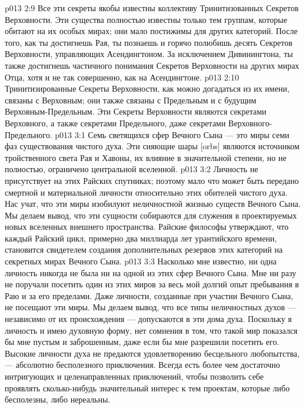 \vs p013 2:9 \pc Все эти секреты якобы известны коллективу Тринитизованных Секретов Верховности. Эти существа полностью известны только тем группам, которые обитают на их особых мирах; они мало постижимы для других категорий. После того, как ты достигнешь Рая, ты познаешь и горячо полюбишь десять Секретов Верховности, управляющих Асендингтоном. За исключением Дивинингтона, ты также достигнешь частичного понимания Секретов Верховности на других мирах Отца, хотя и не так совершенно, как на Асендингтоне.
\vs p013 2:10 Тринитизированные Секреты Верховности, как можно догадаться из их имени, связаны с Верховным; они также связаны с Предельным и с будущим Верховным\hyp{}Предельным. Эти Секреты Верховности являются секретами Верховного, а также секретами Предельного, даже секретами Верховного\hyp{}Предельного.
\vs p013 3:1 Семь светящихся сфер Вечного Сына --- это миры семи фаз существования чистого духа. Эти сияющие шары [orbs] являются источником тройственного света Рая и Хавоны, их влияние в значительной степени, но не полностью, ограничено центральной вселенной.
\vs p013 3:2 Личность не присутствует на этих Райских спутниках; поэтому мало что может быть передано смертной и материальной личности относительно этих обителей чистого духа. Нас учат, что эти миры изобилуют неличностной жизнью существ Вечного Сына. Мы делаем вывод, что эти сущности собираются для служения в проектируемых новых вселенных внешнего пространства. Райские философы утверждают, что каждый Райский цикл, примерно два миллиарда лет урантийского времени, становится свидетелем создания дополнительных резервов этих категорий на секретных мирах Вечного Сына.
\vs p013 3:3 \pc Насколько мне известно, ни одна личность никогда не была ни на одной из этих сфер Вечного Сына. Мне ни разу не поручали посетить один из этих миров за весь мой долгий опыт пребывания в Раю и за его пределами. Даже личности, созданные при участии Вечного Сына, не посещают эти миры. Мы делаем вывод, что все типы неличностных духов --- независимо от их происхождения --- допускаются в эти дома духа. Поскольку я личность и имею духовную форму, нет сомнения в том, что такой мир показался бы мне пустым и заброшенным, даже если бы мне разрешили посетить его. Высокие личности духа не предаются удовлетворению бесцельного любопытства, --- абсолютно бесполезного приключения. Всегда есть более чем достаточно интригующих и целенаправленных приключений, чтобы позволить себе проявлять сколько\hyp{}нибудь значительный интерес к тем проектам, которые либо бесполезны, либо нереальны.
